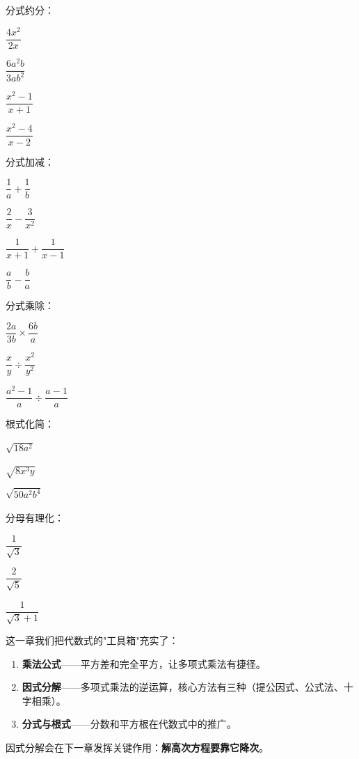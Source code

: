 \begin{exercise}
\item 分式约分：
  \begin{subexercise}
    \item $\dfrac{4x^2}{2x}$
    \item $\dfrac{6a^2b}{3ab^2}$
    \item $\dfrac{x^2-1}{x+1}$
    \item $\dfrac{x^2-4}{x-2}$
  \end{subexercise}

\item 分式加减：
  \begin{subexercise}
    \item $\dfrac{1}{a} + \dfrac{1}{b}$
    \item $\dfrac{2}{x} - \dfrac{3}{x^2}$
    \item $\dfrac{1}{x+1} + \dfrac{1}{x-1}$
    \item $\dfrac{a}{b} - \dfrac{b}{a}$
  \end{subexercise}

\item 分式乘除：
  \begin{subexercise}
    \item $\dfrac{2a}{3b} \times \dfrac{6b}{a}$
    \item $\dfrac{x}{y} \div \dfrac{x^2}{y^2}$
    \item $\dfrac{a^2-1}{a} \div \dfrac{a-1}{a}$
  \end{subexercise}

\item 根式化简：
  \begin{subexercise}
    \item $\sqrt{18a^2}$
    \item $\sqrt{8x^3y}$
    \item $\sqrt{50a^2b^4}$
  \end{subexercise}

\item 分母有理化：
  \begin{subexercise}
    \item $\dfrac{1}{\sqrt{3}}$
    \item $\dfrac{2}{\sqrt{5}}$
    \item $\dfrac{1}{\sqrt{3}+1}$
  \end{subexercise}
\end{exercise}


这一章我们把代数式的"工具箱"充实了：

\begin{enumerate}
  \item \textbf{乘法公式}——平方差和完全平方，让多项式乘法有捷径。
  \item \textbf{因式分解}——多项式乘法的逆运算，核心方法有三种（提公因式、公式法、十字相乘）。
  \item \textbf{分式与根式}——分数和平方根在代数式中的推广。
\end{enumerate}

因式分解会在下一章发挥关键作用：\textbf{解高次方程要靠它降次}。
